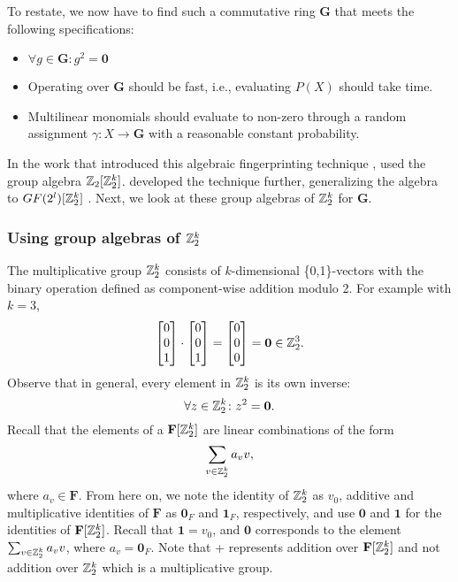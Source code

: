 To restate, we now have to find such a commutative ring $\mathbf{G}$ that 
meets the following specifications: 
\begin{itemize}
  \item $\forall g \in \mathbf{G} \colon g^2 = \mathbf{0}$
  \item Operating over $\mathbf{G}$ should be fast, i.e., evaluating 
  $P(X)$ should take  time.
  \item Multilinear monomials should evaluate to non-zero
  through a random assignment 
  $\gamma \colon X \to \mathbf{G}$ with a reasonable constant probability.
\end{itemize}

In the work that introduced 
this algebraic fingerprinting technique \cite{Koutis08}, 
\citeauthor{Koutis08} used the group algebra $\mathbb Z_2[\mathbb Z_2^k]$. 
\citeauthor{Williams09} developed the technique further, 
generalizing the algebra to $GF(2^{l})[\mathbb Z_2^k]$ \cite{Williams09}. 
Next, we look at these group algebras of $\mathbb Z_2^k$ for $\mathbf{G}$. 

\subsubsection{Using group algebras of $\mathbb Z_2^k$}

The multiplicative group $\mathbb Z_2^k$ consists of $k$-dimensional \{0,1\}-vectors 
with the binary operation defined as component-wise addition modulo 2. 
For example with $k = 3$, 
\[
  \begin{bmatrix} 0 \\ 0 \\ 1 \end{bmatrix} \cdot 
  \begin{bmatrix} 0 \\ 0 \\ 1 \end{bmatrix} =
  \begin{bmatrix} 0 \\ 0 \\ 0 \end{bmatrix} = \mathbf{0} \in \mathbb Z_2^3.
\]
Observe that in general, every element in $\mathbb Z_2^k$ is its own inverse:
\begin{equation}
  \label{eq:Z_2^k has char 2}
  \forall z \in \mathbb Z_2^k \colon z^2 = \mathbf{0}.
\end{equation}
Recall that the elements of a
$\mathbf{F}[\mathbb Z_2^k]$ are linear combinations of the form 
\[
  \displaystyle \sum_{v \in \mathbb Z_2^k}a_v v,
\]
where $a_v \in \mathbf{F}$. From here on, we note the identity of $\mathbb Z_2^k$ as $v_0$, additive and 
multiplicative identities of $\mathbf{F}$ as $\mathbf{0}_F$ and $\mathbf{1}_F$, respectively, and 
use $\mathbf{0}$ and $\mathbf{1}$ for the identities of 
$\mathbf{F}[\mathbb Z_2^k]$. Recall that $\mathbf{1} = v_0$, and
$\mathbf{0}$ corresponds to the element $\sum_{v \in \mathbb Z_2^k}a_v v$, where $a_v =
\mathbf{0}_F$. Note that + represents addition over $\mathbf{F}[\mathbb Z_2^k]$ and not 
addition over $\mathbb Z_2^k$ which is a multiplicative group.

